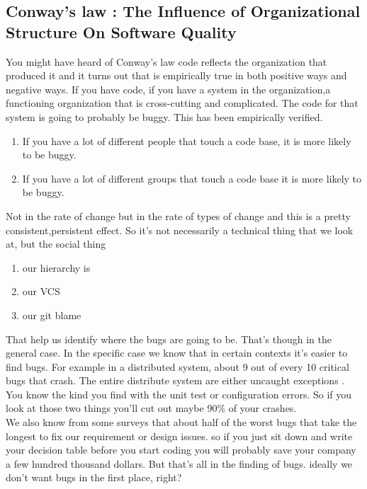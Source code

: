 \documentclass[conference, compsoc, twoside]{IEEEtran}
\begin{document}
\subsection{Conway's law : The Influence of Organizational Structure On Software Quality}
You might have heard of Conway's law code reflects the organization that produced it and it
turns out that is empirically true in both positive ways and negative ways.
If you have code, if you have a system in the organization,a functioning organization that is cross-cutting and complicated.
The code for that system is going to probably be buggy. 
This has been empirically verified. 
\begin{enumerate}
	\item If you have a lot of different people that touch a code base, it is more likely to be buggy.
	\item If you have a lot of different groups that touch a code base it is more likely to be buggy. 
\end{enumerate}
Not in the rate of change but in the rate of types of change and this is a pretty consistent,persistent effect.
So it's not necessarily a technical thing that we look at, but the social thing
\begin{enumerate}
	\item our hierarchy is
	\item our VCS
	\item our git blame
\end{enumerate}
That help us identify where the bugs are going to be. That's though in the general case.
In the specific case we know that in certain contexts it's easier to find bugs. 
For example in a distributed system, about 9 out of every 10 critical bugs that crash.
The entire distribute system are either uncaught exceptions .
You know the kind you find with the unit test or configuration errors.
So if you look at those two things you'll cut out maybe 90\% of your crashes.
\\
We also know from some surveys that about half of the worst bugs that take the longest to fix our requirement or design issues. 
so if you just sit down and write your decision table before you start coding you will probably save your company a few hundred thousand dollars. But that's all in the finding of bugs.
ideally we don't want bugs in the first place, right? 
\end{document}
